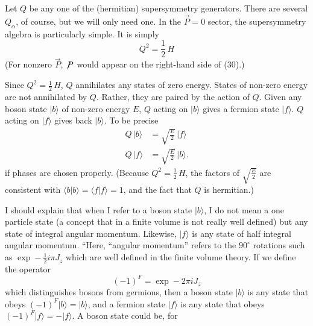 Let $Q$ be any one of the (hermitian) supersymmetry generators.
There are several $Q_\alpha$, of course, but we will only need one. In the
$\vec P = 0$ sector, the supersymmetry algebra is particularly simple. It
is simply
\begin{equation}
Q^2 = \frac{1}{2}\, H
\tag{30}
\end{equation}
(For nonzero $\vec P$, $\not\!P$ would appear on the right-hand side of (30).)

Since $Q^2 = \frac{1}{2}\, H$, $Q$ annihilates any states of zero energy. States
of non-zero energy are not annihilated by $Q$. Rather, they are paired
by the action of $Q$. Given any boson state $|b\rangle$ of non-zero energy $E$,
$Q$ acting on $|b\rangle$ gives a fermion state $|f\rangle$. $Q$ acting on $|f\rangle$ gives
back $|b\rangle$. To be precise
\begin{equation}
\begin{aligned}
Q\, |b\rangle &= \sqrt{\frac{E}{2}}\, |f\rangle \\
Q\, |f\rangle &= \sqrt{\frac{E}{2}}\, |b\rangle .
\end{aligned}
\tag{31}
\end{equation}
if phases are chosen properly. (Because $Q^2 = \frac{1}{2}\, H$, the factors of
$\sqrt{\frac{E}{2}}$ are consistent with $\langle b|b\rangle = \langle f|f\rangle = 1$, and the fact that $Q$ is
hermitian.)

I should explain that when I refer to a boson state $|b\rangle$, I do
not mean a one particle state (a concept that in a finite volume is
not really well defined) but any state of integral angular momentum.
Likewise, $|f\rangle$ is any state of half integral angular momentum. ``Here,
``angular momentum'' refers to the $90^\circ$ rotations such as $\exp - \frac{1}{2} i\pi J_z$
which are well defined in the finite volume theory. If we define
the operator
\begin{equation}
(-1)^F = \exp - 2\pi i J_z
\tag{32}
\end{equation}
which distinguishes bosons from germions, then a boson state $|b\rangle$ is
any state that obeys $(-1)^F |b\rangle = |b\rangle$, and a fermion state $|f\rangle$ is any
state that obeys $(-1)^F |f\rangle = -|f\rangle$. A boson state could be, for
